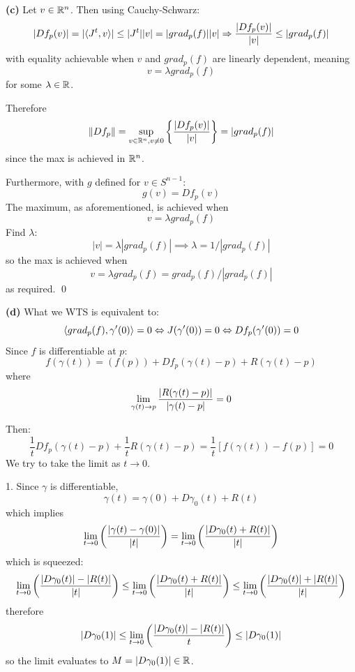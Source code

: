 \documentclass[a4paper, 12pt]{article}
\begin{document}
\begin{solution}
    \textbf{(c)} Let $v \in \mathbb{R}^n$. Then using Cauchy-Schwarz: \[
        \lvert Df_p(v)\rvert = \lvert\langle J^t, v \rangle\rvert \leq \lvert J^t\rvert\lvert v\rvert = \lvert grad_p(f)\rvert\lvert v\rvert \Rightarrow \frac{\lvert Df_p(v)\rvert}{\lvert v\rvert} \leq \lvert grad_p(f)\rvert
    \]
    with equality achievable when $v$ and $grad_p(f)$ are linearly dependent, meaning \[
        v = \lambda grad_p(f)
    \]
    for some $\lambda \in \mathbb{R}$.

    Therefore \[
        \lVert Df_p\rVert = \sup_{v \in \mathbb{R}^n, v \neq 0} \left\{\frac{|Df_p(v)|}{|v|}\right\} = \lvert grad_p(f)\rvert
    \]
    since the max is achieved in $\mathbb{R}^n$.

    Furthermore, with $g$ defined for $v \in S^{n-1}$:\[
        g(v) = Df_p(v)
    \]
    The maximum, as aforementioned, is achieved when  \[
        v = \lambda grad_p(f)
    \]
    Find $\lambda$:
    \[
        |v| = \lambda |grad_p(f)| \implies \lambda = 1/|grad_p(f)|
    \]
    so the max is achieved when \[
        v = \lambda grad_p(f) = grad_p(f) / |grad_p(f)|
    \]
    as required. \qed

    \textbf{(d)} What we WTS is equivalent to:\[
        \langle grad_p(f), \gamma'(0) \rangle = 0 \Leftrightarrow J(\gamma'(0)) = 0 \Leftrightarrow Df_p(\gamma'(0)) = 0
    \]
    Since $f$ is differentiable at $p$:
    \[
        f(\gamma(t)) = (f(p)) + Df_p(\gamma(t) - p) + R(\gamma(t) - p)
    \]
    where \[
        \lim_{\gamma(t) \to p} \frac{\lvert R(\gamma (t) - p)\rvert}{\lvert\gamma(t) - p\rvert} = 0
    \]

    Then:
    \begin{equation} \label{eq1}
        \frac{1}{t} Df_p(\gamma(t) - p) + \frac{1}{t}R(\gamma(t) - p) = \frac{1}{t} [f(\gamma(t)) - f(p)]  = 0
    \end{equation}
    We try to take the limit as $t \to 0$.

    1. Since $\gamma$ is differentiable, \[
        \gamma(t) = \gamma(0) + D\gamma_{0}(t) + R(t)
    \]
    which implies \[
        \lim_{t \to 0}\left(\frac{\lvert\gamma(t) - \gamma(0)\rvert}{|t|}\right) = \lim_{t \to 0}\left(\frac{\lvert D \gamma_0(t) + R(t)\rvert}{|t|}\right)
    \]
    which is squeezed:
    \[
        \lim_{t \to 0}\left(\frac{\lvert D \gamma_0(t)\rvert - \lvert R(t)\rvert}{|t|}\right) \leq \lim_{t \to 0}\left(\frac{\lvert D \gamma_0(t) + R(t)\rvert}{|t|}\right) \leq\lim_{t \to 0}\left(\frac{\lvert D \gamma_0(t)\rvert + \lvert R(t)\rvert}{|t|}\right)
    \]
    therefore \begin{equation} \label{eq2}
        |D\gamma_0(1)| \leq \lim_{t \to 0}\left(\frac{\lvert D \gamma_0(t)\rvert - \lvert R(t)\rvert}{t}\right) \leq |D\gamma_0(1)|
    \end{equation}
    so the limit evaluates to $M = |D\gamma_0(1)| \in \mathbb{R}$.


\end{solution}
\end{document}
